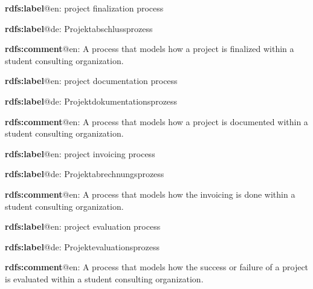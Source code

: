 \documentclass[a4paper, DIV=13, BCOR=0cm]{scrbook}
\begin{document}
\begin{mdframed}[style=onto-2, frametitle={Project\_Finalization\_Process}]
	{%
		\begin{compactitem}
			\item \textbf{rdfs:label}@en: project finalization process
			\item \textbf{rdfs:label}@de: Projektabschlussprozess
			\item \textbf{rdfs:comment}@en: A process that models how a project is finalized within a student consulting organization.
		\end{compactitem}
	} %
\end{mdframed}

\begin{mdframed}[style=onto-3, frametitle={Project\_Documentation\_Process}]
	{%
		\begin{compactitem}
			\item \textbf{rdfs:label}@en: project documentation process
			\item \textbf{rdfs:label}@de: Projektdokumentationsprozess
			\item \textbf{rdfs:comment}@en: A process that models how a project is documented within a student consulting organization.
		\end{compactitem}
	} %
\end{mdframed}

\begin{mdframed}[style=onto-3, frametitle={Project\_Invoicing\_Process}]
	{%
		\begin{compactitem}
			\item \textbf{rdfs:label}@en: project invoicing process
			\item \textbf{rdfs:label}@de: Projektabrechnungsprozess
			\item \textbf{rdfs:comment}@en: A process that models how the invoicing is done within a student consulting organization.
		\end{compactitem}
	} %
\end{mdframed}

\begin{mdframed}[style=onto-3, frametitle={Project\_Evaluation\_Process}]
	{%
		\begin{compactitem}
			\item \textbf{rdfs:label}@en: project evaluation process
			\item \textbf{rdfs:label}@de: Projektevaluationsprozess
			\item \textbf{rdfs:comment}@en: A process that models how the success or failure of a project is evaluated within a student consulting organization.
		\end{compactitem}
	} %
\end{mdframed}
\end{document}
